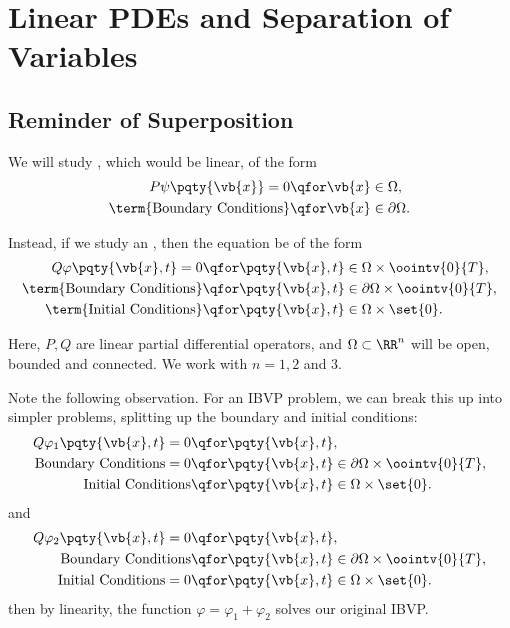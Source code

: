 {\section{Linear PDEs and Separation of Variables}
\subsection{Reminder of Superposition}

We will study , which would be linear, of the form
\begin{subequations}
    \begin{align}
        P \psi \pqty{\vb{x}} = 0 &\qfor \vb{x} \in \Omega, \\
        \text{\term{Boundary Conditions}} &\qfor \vb{x} \in \partial \Omega.
    \end{align}
\end{subequations}

Instead, if we study an , then the equation be of the form
\begin{subequations}
    \begin{align}
        Q \varphi\pqty{\vb{x}, t} = 0 &\qfor \pqty{\vb{x}, t} \in \Omega \times \oointv{0}{T}, \\
        \text{\term{Boundary Conditions}} &\qfor \pqty{\vb{x}, t} \in \partial \Omega \times \oointv{0}{T}, \\
        \text{\term{Initial Conditions}} &\qfor \pqty{\vb{x}, t} \in \Omega \times \set{0}.
    \end{align}
\end{subequations}

Here, \(P, Q\) are linear partial differential operators, and \(\Omega \subset \RR^n\) will be open, bounded and connected. We work with \(n = 1, 2\) and 3.

Note the following observation. For an IBVP problem, we can break this up into simpler problems, splitting up the boundary and initial conditions:
\begin{subequations}
    \begin{align}
        Q \varphi_1 \pqty{\vb{x}, t} = 0 &\qfor \pqty{\vb{x}, t}, \\
        \text{Boundary Conditions} = 0 &\qfor \pqty{\vb{x}, t} \in \partial \Omega \times \oointv{0}{T}, \\
        \text{Initial Conditions} &\qfor \pqty{\vb{x}, t} \in \Omega \times \set{0}.
    \end{align}
\end{subequations}
and
\begin{subequations}
    \begin{align}
        Q \varphi_2 \pqty{\vb{x}, t} = 0 &\qfor \pqty{\vb{x}, t}, \\
        \text{Boundary Conditions} &\qfor \pqty{\vb{x}, t} \in \partial \Omega \times \oointv{0}{T}, \\
        \text{Initial Conditions} = 0 &\qfor \pqty{\vb{x}, t} \in \Omega \times \set{0}.
    \end{align}
\end{subequations}
then by linearity, the function \(\varphi = \varphi_1 + \varphi_2\) solves our original IBVP.

}
